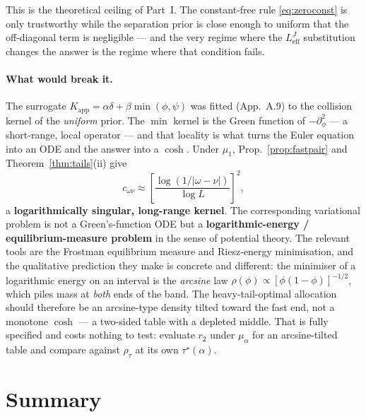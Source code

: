 \documentclass[11pt]{article}
\theoremstyle{definition}
\newcommand{\Leff}{L_{\mathrm{eff}}^{J}}
\begin{document}
This is the theoretical ceiling of Part~I. The constant-free rule \eqref{eq:zeroconst} is only
trustworthy while the separation prior is close enough to uniform that the off-diagonal term is
negligible --- and the very regime where the $\Leff$ substitution changes the answer is the regime
where that condition fails.

\paragraph{What would break it.} The surrogate $K_{\mathrm{app}}=\alpha\delta+\beta\min(\phi,\psi)$
was fitted (App.~A.9) to the collision kernel of the \emph{uniform} prior. The $\min$ kernel is the
Green function of $-\partial_\phi^2$ --- a short-range, local operator --- and that locality is what
turns the Euler equation into an ODE and the answer into a $\cosh$. Under $\mu_1$,
Prop.~\ref{prop:fastpair} and Theorem~\ref{thm:tails}(ii) give
\begin{equation}
c_{\omega\nu}\approx\left[\frac{\log(1/|\omega-\nu|)}{\log L}\right]^2 ,
\end{equation}
a \textbf{logarithmically singular, long-range kernel}. The corresponding variational problem is
not a Green's-function ODE but a \textbf{logarithmic-energy / equilibrium-measure problem} in the
sense of potential theory. The relevant tools are the Frostman equilibrium measure and Riesz-energy
minimisation, and the qualitative prediction they make is concrete and different: the minimiser of
a logarithmic energy on an interval is the \emph{arcsine} law
$\rho(\phi)\propto[\phi(1-\phi)]^{-1/2}$, which piles mass at \emph{both} ends of the band. The
heavy-tail-optimal allocation should therefore be an arcsine-type density tilted toward the fast
end, not a monotone $\cosh$ --- a two-sided table with a depleted middle. That is fully specified
and costs nothing to test: evaluate $r_2$ under $\mu_\alpha$ for an arcsine-tilted table and
compare against $\rho_\tau$ at its own $\tau^\star(\alpha)$.

\section{Summary}
\end{document}
